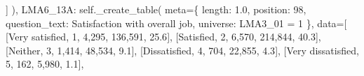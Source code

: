 \documentclass[
  11pt,
  a4paper,
]{article}
\newenvironment{Shaded}{\begin{snugshade}}{\end{snugshade}}
\newcommand{\NormalTok}[1]{\textcolor[rgb]{0.00,0.23,0.31}{#1}}
\newcommand{\OperatorTok}[1]{\textcolor[rgb]{0.37,0.37,0.37}{#1}}
\newcommand{\StringTok}[1]{\textcolor[rgb]{0.13,0.47,0.30}{#1}}
\newcommand{\VariableTok}[1]{\textcolor[rgb]{0.07,0.07,0.07}{#1}}
\begin{document}
\begin{Shaded}
\begin{Highlighting}[]
\NormalTok{                ]}
\NormalTok{            ),}
            \StringTok{\textquotesingle{}LMA6\_13A\textquotesingle{}}\NormalTok{: }\VariableTok{self}\NormalTok{.\_create\_table(}
\NormalTok{                meta}\OperatorTok{=}\NormalTok{\{}
                    \StringTok{\textquotesingle{}length\textquotesingle{}}\NormalTok{: }\StringTok{\textquotesingle{}1.0\textquotesingle{}}\NormalTok{, }\StringTok{\textquotesingle{}position\textquotesingle{}}\NormalTok{: }\StringTok{\textquotesingle{}98\textquotesingle{}}\NormalTok{,}
                    \StringTok{\textquotesingle{}question\_text\textquotesingle{}}\NormalTok{: }\StringTok{\textquotesingle{}Satisfaction with overall job\textquotesingle{}}\NormalTok{,}
                    \StringTok{\textquotesingle{}universe\textquotesingle{}}\NormalTok{: }\StringTok{\textquotesingle{}LMA3\_01 = 1\textquotesingle{}}
\NormalTok{                \},}
\NormalTok{                data}\OperatorTok{=}\NormalTok{[}
\NormalTok{                    [}\StringTok{\textquotesingle{}Very satisfied\textquotesingle{}}\NormalTok{, }\StringTok{\textquotesingle{}1\textquotesingle{}}\NormalTok{, }\StringTok{\textquotesingle{}4,295\textquotesingle{}}\NormalTok{, }\StringTok{\textquotesingle{}136,591\textquotesingle{}}\NormalTok{, }\StringTok{\textquotesingle{}25.6\textquotesingle{}}\NormalTok{],}
\NormalTok{                    [}\StringTok{\textquotesingle{}Satisfied\textquotesingle{}}\NormalTok{, }\StringTok{\textquotesingle{}2\textquotesingle{}}\NormalTok{, }\StringTok{\textquotesingle{}6,570\textquotesingle{}}\NormalTok{, }\StringTok{\textquotesingle{}214,844\textquotesingle{}}\NormalTok{, }\StringTok{\textquotesingle{}40.3\textquotesingle{}}\NormalTok{],}
\NormalTok{                    [}\StringTok{\textquotesingle{}Neither\textquotesingle{}}\NormalTok{, }\StringTok{\textquotesingle{}3\textquotesingle{}}\NormalTok{, }\StringTok{\textquotesingle{}1,414\textquotesingle{}}\NormalTok{, }\StringTok{\textquotesingle{}48,534\textquotesingle{}}\NormalTok{, }\StringTok{\textquotesingle{}9.1\textquotesingle{}}\NormalTok{],}
\NormalTok{                    [}\StringTok{\textquotesingle{}Dissatisfied\textquotesingle{}}\NormalTok{, }\StringTok{\textquotesingle{}4\textquotesingle{}}\NormalTok{, }\StringTok{\textquotesingle{}704\textquotesingle{}}\NormalTok{, }\StringTok{\textquotesingle{}22,855\textquotesingle{}}\NormalTok{, }\StringTok{\textquotesingle{}4.3\textquotesingle{}}\NormalTok{],}
\NormalTok{                    [}\StringTok{\textquotesingle{}Very dissatisfied\textquotesingle{}}\NormalTok{, }\StringTok{\textquotesingle{}5\textquotesingle{}}\NormalTok{, }\StringTok{\textquotesingle{}162\textquotesingle{}}\NormalTok{, }\StringTok{\textquotesingle{}5,980\textquotesingle{}}\NormalTok{, }\StringTok{\textquotesingle{}1.1\textquotesingle{}}\NormalTok{],}

\end{Highlighting}
\end{Shaded}
\end{document}
